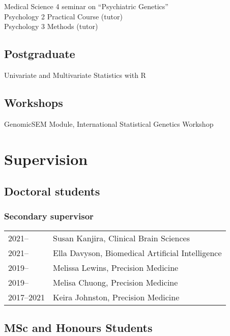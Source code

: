 \documentclass[11pt]{article}
\begin{document}
Medical Science 4 seminar on ``Psychiatric Genetics'' \\ 
Psychology 2 Practical Course (tutor) \\
Psychology 3 Methods (tutor)

\subsection*{Postgraduate}

Univariate and Multivariate Statistics with R 

\subsection*{Workshops}

GenomicSEM Module, International Statistical Genetics Workshop

\section*{Supervision}

\subsection*{Doctoral students}

\subsubsection*{Secondary supervisor}

\begin{tabular}{p{3cm}p{12cm}}
2021-- & Susan Kanjira, Clinical Brain Sciences \\

2021-- & Ella Davyson, Biomedical Artificial Intelligence \\

2019-- & Melissa Lewins, Precision Medicine \\

2019-- & Melisa Chuong, Precision Medicine \\

2017--2021 & Keira Johnston, Precision Medicine

\end{tabular}

\subsection*{MSc and Honours Students}
\end{document}
